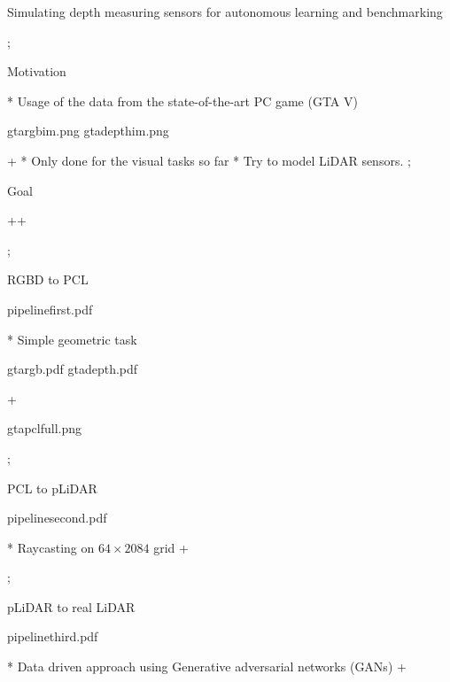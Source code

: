 

\worktype[M/EN]

\def\picdir{img/}
\edef\restore{\leftskip=\the\leftskip \relax}


\slideshow

\tit Simulating depth measuring sensors for autonomous learning and benchmarking


\pg; %

\sec Motivation

* Usage of the data from the state-of-the-art PC game (GTA V) 
\medskip
\centerline{\picw=7cm \inspic gtargbim.png \hfil \picw=7cm \inspic gtadepthim.png }
\pg+
* Only done for the visual tasks so far
* Try to model LiDAR sensors.
\pg;

\sec Goal

\medskip
\medskip
{}
\pg+\pg+

\pg; %

\sec RGBD to PCL

\centerline{\picw=10cm \inspic pipelinefirst.pdf }
* Simple geometric task
\medskip
\centerline{\picw=6cm \inspic gtargb.pdf \hfil \picw=6cm \inspic gtadepth.pdf }
\pg+
\medskip
\centerline{\picw=10cm \inspic gtapclfull.png }

\pg;

\sec PCL to pLiDAR

\centerline{\picw=10cm \inspic pipelinesecond.pdf }
* Raycasting on $64\times2084$ grid
\medskip
{}
\pg+

\pg;

\sec pLiDAR to real LiDAR

\centerline{\picw=10cm \inspic pipelinethird.pdf }
* Data driven approach using Generative adversarial networks (GANs)
\medskip
{}
\pg+

